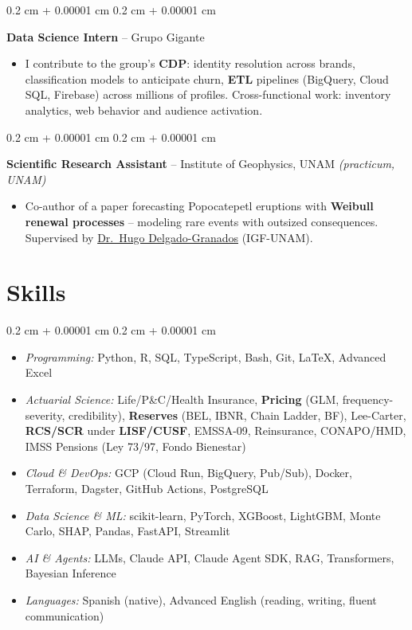 \documentclass[10pt, letterpaper]{article}
\newenvironment{highlights}{
    \begin{itemize}[
        topsep=0.05 cm,
        parsep=0.05 cm,
        partopsep=0pt,
        itemsep=0pt,
        leftmargin=0.4 cm + 10pt
    ]
}{
    \end{itemize}
}
\newenvironment{highlightsforbulletentries}{
    \begin{itemize}[
        topsep=0.02 cm,
        parsep=0.05 cm,
        partopsep=0pt,
        itemsep=0pt,
        leftmargin=10pt
    ]
}{
    \end{itemize}
}
\newenvironment{onecolentry}{
    \begin{adjustwidth}{
        0.2 cm + 0.00001 cm
    }{
        0.2 cm + 0.00001 cm
    }
}{
    \end{adjustwidth}
}
\let\hrefWithoutArrow\href
\renewcommand{\href}[2]{\hrefWithoutArrow{#1}{\ifthenelse{\equal{#2}{}}{ }{#2 }\raisebox{.15ex}{\footnotesize \faExternalLink*}}}
\begin{document}
        \begin{onecolentry}
            \textbf{Data Science Intern} -- Grupo Gigante
            \begin{highlights}
                \item I contribute to the group's \textbf{CDP}: identity resolution across brands, classification models to anticipate churn, \textbf{ETL} pipelines (BigQuery, Cloud SQL, Firebase) across millions of profiles. Cross-functional work: inventory analytics, web behavior and audience activation.
            \end{highlights}
            \end{onecolentry}

        \vspace{0.02 cm}

        \begin{onecolentry}
            \textbf{Scientific Research Assistant} -- Institute of Geophysics, UNAM \textit{(practicum, UNAM)}
            \begin{highlights}
                \item Co-author of a paper forecasting Popocatepetl eruptions with \textbf{Weibull renewal processes} -- modeling rare events with outsized consequences. Supervised by \hrefWithoutArrow{https://scholar.google.com/citations?user=lDD0DZQAAAAJ}{Dr.\ Hugo Delgado-Granados} (IGF-UNAM).
            \end{highlights}
            \end{onecolentry}


    \section{Skills}

\begin{onecolentry}
    \begin{highlightsforbulletentries}
        \item \textit{Programming:} Python, R, SQL, TypeScript, Bash, Git, \LaTeX, Advanced Excel
        \item \textit{Actuarial Science:} Life/P\&C/Health Insurance, \textbf{Pricing} (GLM, frequency-severity, credibility), \textbf{Reserves} (BEL, IBNR, Chain Ladder, BF), Lee-Carter, \textbf{RCS/SCR} under \textbf{LISF/CUSF}, EMSSA-09, Reinsurance, CONAPO/HMD, IMSS Pensions (Ley 73/97, Fondo Bienestar)
        \item \textit{Cloud \& DevOps:} GCP (Cloud Run, BigQuery, Pub/Sub), Docker, Terraform, Dagster, GitHub Actions, PostgreSQL
        \item \textit{Data Science \& ML:} scikit-learn, PyTorch, XGBoost, LightGBM, Monte Carlo, SHAP, Pandas, FastAPI, Streamlit
        \item \textit{AI \& Agents:} LLMs, Claude API, Claude Agent SDK, RAG, Transformers, Bayesian Inference
        \item \textit{Languages:} Spanish (native), Advanced English (reading, writing, fluent communication)
    \end{highlightsforbulletentries}
\end{onecolentry}
\end{document}
